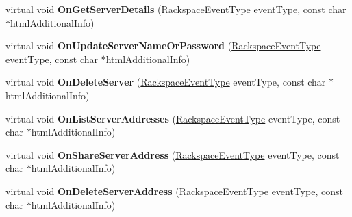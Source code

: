\begin{DoxyCompactItemize}
\item 
\hypertarget{class_rak_net_1_1_rackspace_event_callback___default_a8a3d2b0c8a10f54e8d4e886b67cd96eb}{virtual void {\bfseries On\-Get\-Server\-Details} (\hyperlink{namespace_rak_net_a120cf6e1a0904cff45269f14c3c4c289}{Rackspace\-Event\-Type} event\-Type, const char $\ast$html\-Additional\-Info)}\label{class_rak_net_1_1_rackspace_event_callback___default_a8a3d2b0c8a10f54e8d4e886b67cd96eb}

\item 
\hypertarget{class_rak_net_1_1_rackspace_event_callback___default_aad00eb623473d92d0a58398471a37d9d}{virtual void {\bfseries On\-Update\-Server\-Name\-Or\-Password} (\hyperlink{namespace_rak_net_a120cf6e1a0904cff45269f14c3c4c289}{Rackspace\-Event\-Type} event\-Type, const char $\ast$html\-Additional\-Info)}\label{class_rak_net_1_1_rackspace_event_callback___default_aad00eb623473d92d0a58398471a37d9d}

\item 
\hypertarget{class_rak_net_1_1_rackspace_event_callback___default_a95ac5864bf806e6e1dc7234ae73f32fe}{virtual void {\bfseries On\-Delete\-Server} (\hyperlink{namespace_rak_net_a120cf6e1a0904cff45269f14c3c4c289}{Rackspace\-Event\-Type} event\-Type, const char $\ast$html\-Additional\-Info)}\label{class_rak_net_1_1_rackspace_event_callback___default_a95ac5864bf806e6e1dc7234ae73f32fe}

\item 
\hypertarget{class_rak_net_1_1_rackspace_event_callback___default_a413113e64be2de136e47c25f39b47719}{virtual void {\bfseries On\-List\-Server\-Addresses} (\hyperlink{namespace_rak_net_a120cf6e1a0904cff45269f14c3c4c289}{Rackspace\-Event\-Type} event\-Type, const char $\ast$html\-Additional\-Info)}\label{class_rak_net_1_1_rackspace_event_callback___default_a413113e64be2de136e47c25f39b47719}

\item 
\hypertarget{class_rak_net_1_1_rackspace_event_callback___default_a21e4e11ce54e44bf44b6b771443d37fb}{virtual void {\bfseries On\-Share\-Server\-Address} (\hyperlink{namespace_rak_net_a120cf6e1a0904cff45269f14c3c4c289}{Rackspace\-Event\-Type} event\-Type, const char $\ast$html\-Additional\-Info)}\label{class_rak_net_1_1_rackspace_event_callback___default_a21e4e11ce54e44bf44b6b771443d37fb}

\item 
\hypertarget{class_rak_net_1_1_rackspace_event_callback___default_a1690cfa7bba90c878dd1b0bde61bddad}{virtual void {\bfseries On\-Delete\-Server\-Address} (\hyperlink{namespace_rak_net_a120cf6e1a0904cff45269f14c3c4c289}{Rackspace\-Event\-Type} event\-Type, const char $\ast$html\-Additional\-Info)}\label{class_rak_net_1_1_rackspace_event_callback___default_a1690cfa7bba90c878dd1b0bde61bddad}


\end{DoxyCompactItemize}
